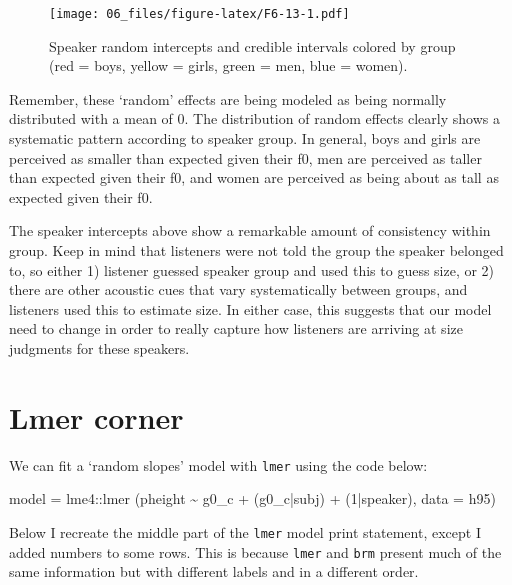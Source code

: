 \documentclass[
]{book}
\newenvironment{Shaded}{\begin{snugshade}}{\end{snugshade}}
\newcommand{\AttributeTok}[1]{\textcolor[rgb]{0.77,0.63,0.00}{#1}}
\newcommand{\DecValTok}[1]{\textcolor[rgb]{0.00,0.00,0.81}{#1}}
\newcommand{\FunctionTok}[1]{\textcolor[rgb]{0.00,0.00,0.00}{#1}}
\newcommand{\NormalTok}[1]{#1}
\newcommand{\OtherTok}[1]{\textcolor[rgb]{0.56,0.35,0.01}{#1}}
\newcommand{\SpecialCharTok}[1]{\textcolor[rgb]{0.00,0.00,0.00}{#1}}
\begin{document}
\begin{figure}
\centering
\texttt{[image: 06\_files/figure-latex/F6-13-1.pdf]}
\caption{\label{fig:F6-13}Speaker random intercepts and credible intervals colored by group (red = boys, yellow = girls, green = men, blue = women).}
\end{figure}

Remember, these `random' effects are being modeled as being normally distributed with a mean of 0. The distribution of random effects clearly shows a systematic pattern according to speaker group. In general, boys and girls are perceived as smaller than expected given their f0, men are perceived as taller than expected given their f0, and women are perceived as being about as tall as expected given their f0.

The speaker intercepts above show a remarkable amount of consistency within group. Keep in mind that listeners were not told the group the speaker belonged to, so either 1) listener guessed speaker group and used this to guess size, or 2) there are other acoustic cues that vary systematically between groups, and listeners used this to estimate size. In either case, this suggests that our model need to change in order to really capture how listeners are arriving at size judgments for these speakers.

\hypertarget{lmer-corner}{%
\section{Lmer corner}\label{lmer-corner}}

We can fit a `random slopes' model with \texttt{lmer} using the code below:

\begin{Shaded}
\begin{Highlighting}[]
\NormalTok{model }\OtherTok{=}\NormalTok{ lme4}\SpecialCharTok{::}\FunctionTok{lmer}\NormalTok{ (pheight }\SpecialCharTok{\textasciitilde{}}\NormalTok{ g0\_c }\SpecialCharTok{+}\NormalTok{  (g0\_c}\SpecialCharTok{|}\NormalTok{subj) }\SpecialCharTok{+}\NormalTok{ (}\DecValTok{1}\SpecialCharTok{|}\NormalTok{speaker), }\AttributeTok{data =}\NormalTok{ h95)}
\end{Highlighting}
\end{Shaded}

Below I recreate the middle part of the \texttt{lmer} model print statement, except I added numbers to some rows. This is because \texttt{lmer} and \texttt{brm} present much of the same information but with different labels and in a different order.
\end{document}
